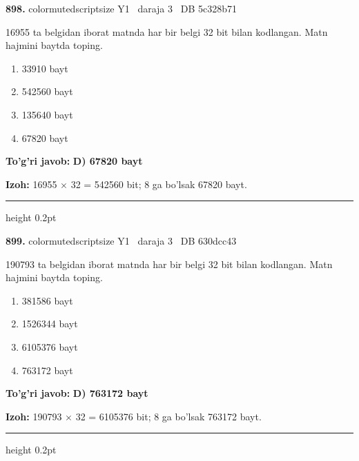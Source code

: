 \documentclass[10pt,a4paper,oneside]{article}
\begin{document}
\noindent\textbf{\color{ink}898.}  {color{muted}scriptsize Y1 \textbullet\ daraja 3 \textbullet\ DB 5c328b71}
\par
16955 ta belgidan iborat matnda har bir belgi 32 bit bilan kodlangan. Matn hajmini baytda toping.
\begin{enumerate}[label=\Alph*),leftmargin=9mm]
\item 33910 bayt
\item 542560 bayt
\item 135640 bayt
\item 67820 bayt
\end{enumerate}
\begin{tcolorbox}[enhanced,breakable,colback=teal!4,colframe=teal!50!black,boxrule=0.5pt,arc=1.1mm,left=3mm,right=3mm,top=1.7mm,bottom=1.7mm,before skip=2mm,after skip=2mm]
\textbf{\color{teal}To'g'ri javob:} \textbf{D) 67820 bayt}
\par\smallskip
\textbf{Izoh:} 16955 \ensuremath{\times} 32 = 542560 bit; 8 ga bo'lsak 67820 bayt.
\end{tcolorbox}
\vspace{2mm}\hrule height 0.2pt \vspace{3mm}

\noindent\textbf{\color{ink}899.}  {color{muted}scriptsize Y1 \textbullet\ daraja 3 \textbullet\ DB 630dcc43}
\par
190793 ta belgidan iborat matnda har bir belgi 32 bit bilan kodlangan. Matn hajmini baytda toping.
\begin{enumerate}[label=\Alph*),leftmargin=9mm]
\item 381586 bayt
\item 1526344 bayt
\item 6105376 bayt
\item 763172 bayt
\end{enumerate}
\begin{tcolorbox}[enhanced,breakable,colback=teal!4,colframe=teal!50!black,boxrule=0.5pt,arc=1.1mm,left=3mm,right=3mm,top=1.7mm,bottom=1.7mm,before skip=2mm,after skip=2mm]
\textbf{\color{teal}To'g'ri javob:} \textbf{D) 763172 bayt}
\par\smallskip
\textbf{Izoh:} 190793 \ensuremath{\times} 32 = 6105376 bit; 8 ga bo'lsak 763172 bayt.
\end{tcolorbox}
\vspace{2mm}\hrule height 0.2pt \vspace{3mm}
\end{document}
